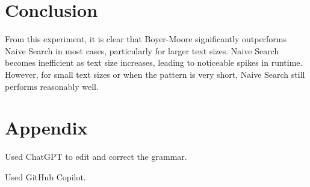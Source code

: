 \documentclass{article}
\begin{document}
 
 \section{Conclusion}

 From this experiment, it is clear that Boyer-Moore significantly outperforms Naive Search in most cases, particularly for larger text sizes. Naive Search becomes inefficient as text size increases, leading to noticeable spikes in runtime. However, for small text sizes  or when the pattern is very short, Naive Search still performs reasonably well.



\section{Appendix}

\item Used ChatGPT to edit and correct the grammar.
\item Used GitHub Copilot.
\end{document}
